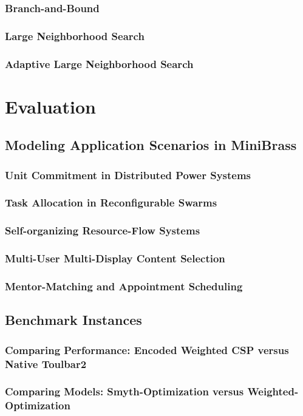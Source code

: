\documentclass[10pt,a4paper]{book}
\begin{document}
\subsection{Branch-and-Bound}
\subsection{Large Neighborhood Search}
\subsection{Adaptive Large Neighborhood Search}


\chapter{Evaluation}
\section{Modeling Application Scenarios in MiniBrass}


\subsection{Unit Commitment in Distributed Power Systems}
\subsection{Task Allocation in Reconfigurable Swarms}
\subsection{Self-organizing Resource-Flow Systems}
\subsection{Multi-User Multi-Display Content Selection}
\subsection{Mentor-Matching and Appointment Scheduling}
\section{Benchmark Instances}
\subsection{Comparing Performance: Encoded Weighted CSP versus Native Toulbar2}
\subsection{Comparing Models: Smyth-Optimization versus Weighted-Optimization}
\end{document}
